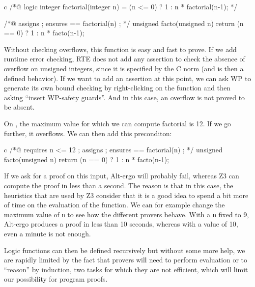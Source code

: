 \documentclass[middle]{zmdocument}
\begin{document}
\begin{CodeBlock}{c}
/*@
  logic integer factorial(integer n) = (n <= 0) ? 1 : n * factorial(n-1);
*/

/*@ 
  assigns \nothing ;
  ensures \result == factorial(n) ; 
*/
unsigned facto(unsigned n){
  return (n == 0) ? 1 : n * facto(n-1);
}
\end{CodeBlock}



Without checking overflows, this function is easy and fast to prove. If
we add runtime error checking, RTE does not add any assertion to check
the absence of overflow on unsigned integers, since it is specified by
the C norm (and is then a defined behavior). If we want to add an
assertion at this point, we can ask WP to generate its own bound
checking by right-clicking on the function and then asking ``insert
WP-safety guards''. And in this case, an overflow is not proved to be
absent.



On , the maximum value for which we can compute
factorial is 12. If we go further, it overflows. We can then add this
preconditon:



\begin{CodeBlock}{c}
/*@ 
  requires n <= 12 ;
  assigns \nothing ;
  ensures \result == factorial(n) ; 
*/
unsigned facto(unsigned n){
  return (n == 0) ? 1 : n * facto(n-1);
}
\end{CodeBlock}



If we ask for a proof on this input, Alt-ergo will probably fail,
whereas Z3 can compute the proof in less than a second. The reason is
that in this case, the heuristics that are used by Z3 consider that it
is a good idea to spend a bit more of time on the evaluation of the
function. We can for example change the maximum value of \texttt{n} to
see how the different provers behave. With a \texttt{n} fixed to 9,
Alt-ergo produces a proof in less than 10 seconds, whereas with a value
of 10, even a minute is not enough.



Logic functions can then be defined recursively but without some more
help, we are rapidly limited by the fact that provers will need to
perform evaluation or to ``reason'' by induction, two tasks for which
they are not efficient, which will limit our possibility for program
proofs.



\end{document}
